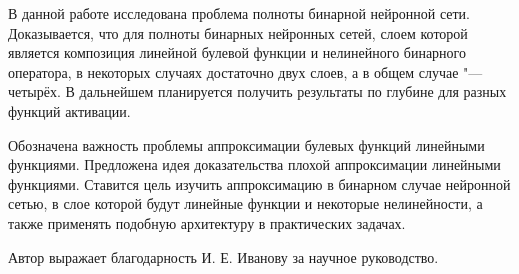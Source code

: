     В данной работе исследована проблема полноты бинарной нейронной сети. Доказывается, что для полноты бинарных нейронных сетей, слоем которой является композиция линейной булевой функции и нелинейного бинарного оператора, в некоторых случаях достаточно двух слоев, а  в общем случае "--- четырёх. В дальнейшем планируется получить результаты по глубине для разных функций активации.
    
    Обозначена важность проблемы аппроксимации булевых функций линейными функциями.
    Предложена идея доказательства плохой аппроксимации линейными функциями. Ставится цель изучить аппроксимацию в бинарном случае нейронной сетью, в слое которой будут линейные функции и некоторые нелинейности, а также применять подобную архитектуру в практических задачах.
    
    Автор выражает благодарность И. Е. Иванову за научное руководство.